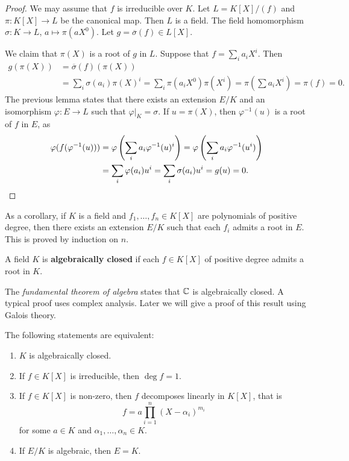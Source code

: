 \begin{proof}
	We may assume that $f$ is irreducible over $K$. Let $L=K[X]/(f)$ and 
	$\pi\colon K[X]\to L$ be the canonical map. Then $L$ 
	is a field. The field homomorphism $\sigma\colon K\to L$, $a\mapsto \pi(aX^0)$. 
	Let $g=\overline{\sigma}(f)\in L[X]$. 

	We claim that $\pi(X)$ is a root of $g$ in $L$. Suppose that $f=\sum_i a_iX^i$. 
	Then 
	\begin{align*}
		g(\pi(X))&=\overline{\sigma}(f)(\pi(X))\\
		&=\sum_i \sigma(a_i)\pi(X)^i
		=\sum_i\pi(a_iX^0)\pi(X^i)=\pi(\sum a_iX^i)=\pi(f)=0.
	\end{align*}
	The previous lemma states that 
	there exists an extension $E/K$ and an isomorphism $\varphi\colon E\to L$
	such that $\varphi|_K=\sigma$. If $u=\pi(X)$, then $\varphi^{-1}(u)$ is a root of $f$ in $E$, 
	as 
	\begin{align*}
		\varphi(f(\varphi^{-1}(u)))&=\varphi\left(\sum_ia_i\varphi^{-1}(u)^i\right)
		=\varphi\left(\sum_ia_i\varphi^{-1}(u^i)\right)\\
		&=\sum_i\varphi(a_i)u^i=\sum_i\sigma(a_i)u^i=g(u)=0.\qedhere
	\end{align*}
\end{proof}

As a corollary, if $K$ is a field and $f_1,\dots,f_n\in K[X]$ are polynomials 
of positive degree, then there exists an extension $E/K$  such that 
each $f_i$ admits a root in $E$. This is proved by induction on $n$.  

\begin{definition}
	A field $K$ is \textbf{algebraically closed} if each $f\in K[X]$ 
	of positive degree admits a root in $K$. 
\end{definition}

The \emph{fundamental theorem of algebra} states that $\mathbb{C}$ is algebraically closed. A
typical proof uses complex analysis.  Later we will give a proof of this result
using Galois theory. 

\begin{proposition}
	The following statements are equivalent:
	\begin{enumerate}
		\item $K$ is algebraically closed.
		\item If $f\in K[X]$ is irreducible, then $\deg f=1$.
		\item If $f\in K[X]$ is non-zero, then $f$ decomposes linearly in $K[X]$, that is
			\[
				f=a\prod_{i=1}^n(X-\alpha_i)^{m_i}
			\]
			for some $a\in K$ and $\alpha_1,\dots,\alpha_n\in K$. 
		\item If $E/K$ is algebraic, then $E=K$. 
	\end{enumerate}
\end{proposition}

